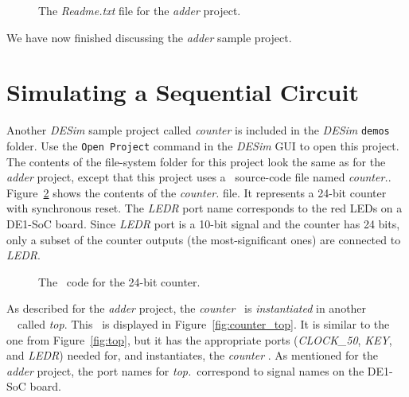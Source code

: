 {\begin{figure}[H]
\begin{center}
\begin{minipage}[t]{18 cm}
	
\end{minipage}
    \caption{The {\it Readme.txt} file for the {\it adder} project.}
	\label{fig:readme}
\end{center}
\end{figure}

\vspace{-0.25cm}
We have now finished discussing the {\it adder} sample project.

\section{Simulating a Sequential Circuit}

Another {\it DESim} sample project called {\it counter} is included in the {\it DESim}
\texttt{demos} folder. Use the \texttt{Open Project} command in the {\it DESim} GUI to open this
project. The contents of the file-system folder for this project look the same as for the 
{\it adder} project, except that this project uses a \hdlName~source-code file named 
{\it counter.\hdlFileExt}.  Figure~\ref{fig:counter} shows the contents of 
the {\it counter.\hdlFileExt} file. It represents a 
24-bit counter with synchronous reset. The {\it LEDR} port name corresponds to the red LEDs
on a DE1-SoC board. Since {\it LEDR} port is a 10-bit signal and the 
counter has 24 bits, only a subset of the counter outputs (the most-significant ones) are 
connected to {\it LEDR}.

\begin{figure}[h]
\begin{center}
\begin{minipage}[h]{15 cm}
	{}
	{}
\end{minipage}
	\caption{The \hdlName~code for the 24-bit counter.}
	\label{fig:counter}
\end{center}
\end{figure}

As described for the {\it adder} project, the {\it counter} \hdlModuleName~is {\it instantiated}
in another \hdlName~\hdlModuleName~called {\it top}. This \hdlModuleName~is displayed in 
Figure~\ref{fig:counter_top}. It is similar to the one from Figure~\ref{fig:top}, but it has
the appropriate ports ({\it CLOCK\_50}, {\it KEY}, and {\it LEDR}) needed for, and
instantiates, the {\it counter} \hdlModuleName.
As mentioned for the {\it adder} project, the port names for {\it top.\hdlFileExt}~correspond 
to signal names on the DE1-SoC board. 

}
